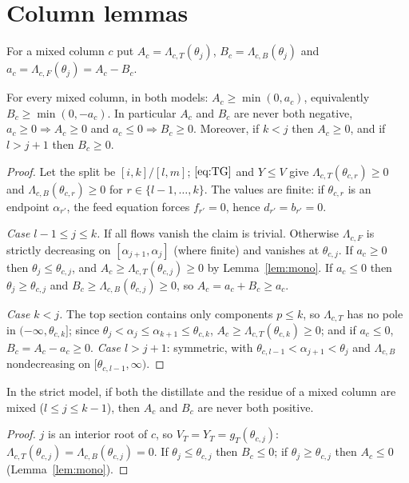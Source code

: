 \documentclass[11pt,a4paper]{report}
\newcommand{\Lam}{\Lambda}
\begin{document}
\section{Column lemmas}

For a mixed column $c$ put $A_c=\Lam_{c,T}(\theta_j)$, $B_c=\Lam_{c,B}(\theta_j)$ and $a_c=\Lam_{c,F}(\theta_j)=A_c-B_c$.

\begin{lemma}\label{lem:sign}
For every mixed column, in both models: $A_c\ge\min(0,a_c)$, equivalently $B_c\ge\min(0,-a_c)$. In particular
$A_c$ and $B_c$ are never both negative, $a_c\ge0\Rightarrow A_c\ge0$ and $a_c\le0\Rightarrow B_c\ge0$. Moreover,
if $k<j$ then $A_c\ge0$, and if $l>j+1$ then $B_c\ge0$.
\end{lemma}
\begin{proof}
Let the split be $[i,k]/[l,m]$; $\eqref{eq:TG}$ and $Y\le V$ give $\Lam_{c,T}(\theta_{c,r})\ge0$ and
$\Lam_{c,B}(\theta_{c,r})\ge0$ for $r\in\{l-1,\dots,k\}$. The values are finite: if $\theta_{c,r}$ is an endpoint
$\alpha_{r'}$, the feed equation forces $f_{r'}=0$, hence $d_{r'}=b_{r'}=0$.

\emph{Case $l-1\le j\le k$.} If all flows vanish the claim is trivial. Otherwise $\Lam_{c,F}$ is strictly decreasing on
$[\alpha_{j+1},\alpha_j]$ (where finite) and vanishes at $\theta_{c,j}$. If $a_c\ge0$ then $\theta_j\le\theta_{c,j}$, and
$A_c\ge\Lam_{c,T}(\theta_{c,j})\ge0$ by Lemma~\ref{lem:mono}. If $a_c\le0$ then $\theta_j\ge\theta_{c,j}$ and
$B_c\ge\Lam_{c,B}(\theta_{c,j})\ge0$, so $A_c=a_c+B_c\ge a_c$.

\emph{Case $k<j$.} The top section contains only components $p\le k$, so $\Lam_{c,T}$ has no pole in
$(-\infty,\theta_{c,k}]$; since $\theta_j<\alpha_j\le\alpha_{k+1}\le\theta_{c,k}$, $A_c\ge\Lam_{c,T}(\theta_{c,k})\ge0$; and if
$a_c\le0$, $B_c=A_c-a_c\ge0$. \emph{Case $l>j+1$}: symmetric, with $\theta_{c,l-1}<\alpha_{j+1}<\theta_j$ and $\Lam_{c,B}$
nondecreasing on $[\theta_{c,l-1},\infty)$.
\end{proof}

\begin{lemma}\label{lem:interior}
In the strict model, if both the distillate and the residue of a mixed column are mixed ($l\le j\le k-1$), then $A_c$
and $B_c$ are never both positive.
\end{lemma}
\begin{proof}
$j$ is an interior root of $c$, so $V_T=Y_T=g_T(\theta_{c,j})$: $\Lam_{c,T}(\theta_{c,j})=\Lam_{c,B}(\theta_{c,j})=0$. If
$\theta_j\le\theta_{c,j}$ then $B_c\le0$; if $\theta_j\ge\theta_{c,j}$ then $A_c\le0$ (Lemma~\ref{lem:mono}).
\end{proof}
\end{document}
